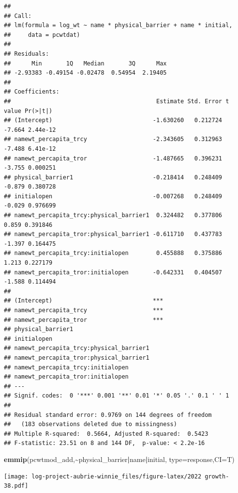 \documentclass[
]{article}
\newenvironment{Shaded}{\begin{snugshade}}{\end{snugshade}}
\newcommand{\AttributeTok}[1]{\textcolor[rgb]{0.13,0.29,0.53}{#1}}
\newcommand{\FunctionTok}[1]{\textcolor[rgb]{0.13,0.29,0.53}{\textbf{#1}}}
\newcommand{\NormalTok}[1]{#1}
\newcommand{\SpecialCharTok}[1]{\textcolor[rgb]{0.81,0.36,0.00}{\textbf{#1}}}
\newcommand{\StringTok}[1]{\textcolor[rgb]{0.31,0.60,0.02}{#1}}
\begin{document}
\begin{verbatim}
## 
## Call:
## lm(formula = log_wt ~ name * physical_barrier + name * initial, 
##     data = pcwtdat)
## 
## Residuals:
##      Min       1Q   Median       3Q      Max 
## -2.93383 -0.49154 -0.02478  0.54954  2.19405 
## 
## Coefficients:
##                                          Estimate Std. Error t value Pr(>|t|)
## (Intercept)                             -1.630260   0.212724  -7.664 2.44e-12
## namewt_percapita_trcy                   -2.343605   0.312963  -7.488 6.41e-12
## namewt_percapita_tror                   -1.487665   0.396231  -3.755 0.000251
## physical_barrier1                       -0.218414   0.248409  -0.879 0.380728
## initialopen                             -0.007268   0.248409  -0.029 0.976699
## namewt_percapita_trcy:physical_barrier1  0.324482   0.377806   0.859 0.391846
## namewt_percapita_tror:physical_barrier1 -0.611710   0.437783  -1.397 0.164475
## namewt_percapita_trcy:initialopen        0.455888   0.375886   1.213 0.227179
## namewt_percapita_tror:initialopen       -0.642331   0.404507  -1.588 0.114494
##                                            
## (Intercept)                             ***
## namewt_percapita_trcy                   ***
## namewt_percapita_tror                   ***
## physical_barrier1                          
## initialopen                                
## namewt_percapita_trcy:physical_barrier1    
## namewt_percapita_tror:physical_barrier1    
## namewt_percapita_trcy:initialopen          
## namewt_percapita_tror:initialopen          
## ---
## Signif. codes:  0 '***' 0.001 '**' 0.01 '*' 0.05 '.' 0.1 ' ' 1
## 
## Residual standard error: 0.9769 on 144 degrees of freedom
##   (183 observations deleted due to missingness)
## Multiple R-squared:  0.5664, Adjusted R-squared:  0.5423 
## F-statistic: 23.51 on 8 and 144 DF,  p-value: < 2.2e-16
\end{verbatim}

\begin{Shaded}
\begin{Highlighting}[]
\FunctionTok{emmip}\NormalTok{(pcwtmod\_add,}\SpecialCharTok{\textasciitilde{}}\NormalTok{physical\_barrier}\SpecialCharTok{|}\NormalTok{name}\SpecialCharTok{|}\NormalTok{initial, }\AttributeTok{type=}\StringTok{\textquotesingle{}response\textquotesingle{}}\NormalTok{,}\AttributeTok{CI=}\NormalTok{T)}
\end{Highlighting}
\end{Shaded}

\texttt{[image: log-project-aubrie-winnie\_files/figure-latex/2022 growth-38.pdf]}
\end{document}
